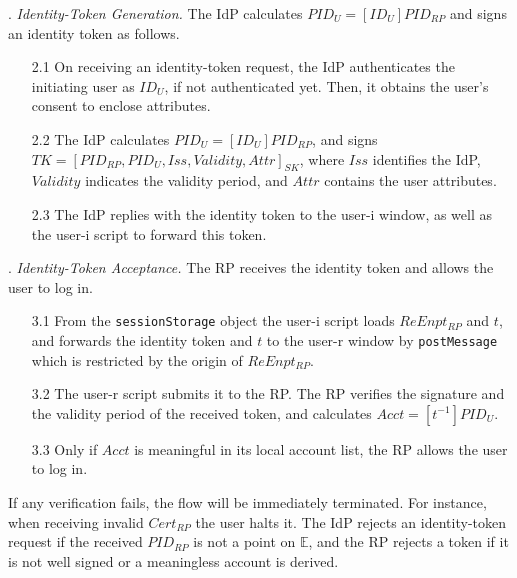 . {\em Identity-Token Generation.}
The IdP calculates $PID_U = [ID_U]{PID_{RP}}$ and signs an identity token as follows. %
\begin{itemize}
\setlength{\topsep}{0pt}
\setlength{\partopsep}{0pt}
\setlength{\itemsep}{0pt}
\setlength{\parsep}{0pt}
\setlength{\parskip}{0pt}
\item[2.1]
On receiving an identity-token request,
the IdP authenticates the initiating user as $ID_U$, if not authenticated yet.
Then, it obtains the user's consent to enclose attributes.
\item[2.2]
The IdP calculates $PID_U = [ID_U]{PID_{RP}}$, and signs $TK = [PID_{RP}, PID_U, Iss, Validity, Attr]_{SK}$,
where $Iss$ identifies the IdP, $Validity$ indicates the validity period, and $Attr$ contains the user attributes.
\item[2.3] The IdP replies with the identity token to the user-i window,
    as well as the user-i script to forward this token.
\end{itemize}


. {\em Identity-Token Acceptance.}
The RP receives the identity token and allows the user to log in.
\begin{itemize}
\setlength{\topsep}{0pt}
\setlength{\partopsep}{0pt}
\setlength{\itemsep}{0pt}
\setlength{\parsep}{0pt}
\setlength{\parskip}{0pt}
\item [3.1]
From the \verb+sessionStorage+ object
the user-i script loads $ReEnpt_{RP}$ and $t$, 
    and forwards the identity token and $t$ to the user-r window by \verb+postMessage+ which is restricted by the origin of $ReEnpt_{RP}$.
\item[3.2] The user-r script submits it to the RP.
The RP verifies the signature and the validity period of the received token, 
and calculates $Acct = [t^{-1}]{PID_U}$.

\item[3.3] Only if $Acct$ is meaningful in its local account list, the RP allows the user to log in.

\end{itemize}

If any verification fails, the flow will be immediately terminated.
For instance, when receiving invalid $Cert_{RP}$ the user halts it.
The IdP rejects an identity-token request if the received $PID_{RP}$ is not a point on $\mathbb{E}$, and the RP rejects a token if it is not well signed or a meaningless account is derived.

